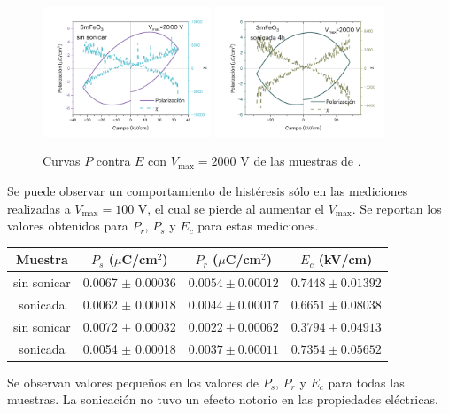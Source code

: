 \documentclass[../main.tex]{subfiles}
\begin{document}
\begin{figure}[H]
    \centering
    \includegraphics[width=0.45\textwidth]{fig/PESmFeO32000V.png}
    \quad
    \includegraphics[width=0.45\textwidth]{fig/PESmFeO3-S2000V.png}
    \caption{Curvas $P$ contra $E$ con $V_\text{max}=2000$ V de las muestras de \sama{}.}
    \label{fig:sm2000v}
\end{figure}
Se puede observar un comportamiento de histéresis sólo en las mediciones realizadas a $V_\text{max}=100$ V, el cual se pierde al aumentar el $V_\text{max}$. Se reportan los valores obtenidos para $P_r$, $P_s$ y $E_c$ para estas mediciones.

\begin{table}[H]
    \centering
    \begin{tabular}{|c||c|c|c|}
        \hline
        Muestra & $P_s$ ($\mu$C/cm$^2$) & $P_r$ ($\mu$C/cm$^2$) & $E_c$ (kV/cm) \\
        \hline\hline
        \neod{} sin sonicar & 0.0067 $\pm$ 0.00036 & $0.0054 \pm 0.00012$ & $0.7448 \pm 0.01392$ \\
        \hline
        \neod{} sonicada & 0.0062 $\pm$ 0.00018 & $0.0044 \pm 0.00017$ & $0.6651 \pm 0.08038$ \\
        \hline
        \sama{} sin sonicar & 0.0072 $\pm$ 0.00032 & $0.0022 \pm 0.00062$ & $0.3794 \pm 0.04913$ \\
        \hline
        \sama{} sonicada & 0.0054 $\pm$ 0.00018 & $0.0037 \pm 0.00011$ & $0.7354 \pm 0.05652$ \\
        \hline
        \end{tabular} 
    \label{tabla:respolar}
\end{table}
Se observan valores pequeños en los valores de $P_s$, $P_r$ y $E_c$ para todas las muestras. La sonicación no tuvo un efecto notorio en las propiedades eléctricas.
\end{document}
